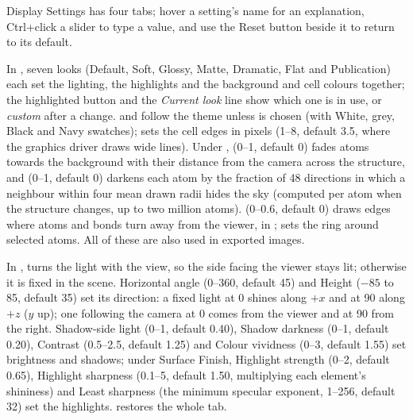 Display Settings has four tabs; hover a setting's name for an explanation, Ctrl+click a slider to type a value, and use the Reset button beside it to return to its default.

In , seven looks (Default, Soft, Glossy, Matte, Dramatic, Flat and Publication) each set the lighting, the highlights and the background and cell colours together; the highlighted button and the \emph{Current look} line show which one is in use, or \emph{custom} after a change.  and  follow the theme unless  is chosen (with White, grey, Black and Navy swatches);  sets the cell edges in pixels (1--8, default 3.5, where the graphics driver draws wide lines). Under ,  (0--1, default 0) fades atoms towards the background with their distance from the camera across the structure, and  (0--1, default 0) darkens each atom by the fraction of 48 directions in which a neighbour within four mean drawn radii hides the sky (computed per atom when the structure changes, up to two million atoms).  (0--0.6, default 0) draws edges where atoms and bonds turn away from the viewer, in ;  sets the ring around selected atoms. All of these are also used in exported images.

In ,  turns the light with the view, so the side facing the viewer stays lit; otherwise it is fixed in the scene. Horizontal angle (0--360\textdegree, default 45\textdegree) and Height ($-85$ to 85\textdegree, default 35\textdegree) set its direction: a fixed light at 0\textdegree{} shines along $+x$ and at 90\textdegree{} along $+z$ ($y$ up); one following the camera at 0\textdegree{} comes from the viewer and at 90\textdegree{} from the right. Shadow-side light (0--1, default 0.40), Shadow darkness (0--1, default 0.20), Contrast (0.5--2.5, default 1.25) and Colour vividness (0--3, default 1.55) set brightness and shadows; under Surface Finish, Highlight strength (0--2, default 0.65), Highlight sharpness (0.1--5, default 1.50, multiplying each element's shininess) and Least sharpness (the minimum specular exponent, 1--256, default 32) set the highlights.  restores the whole tab.

